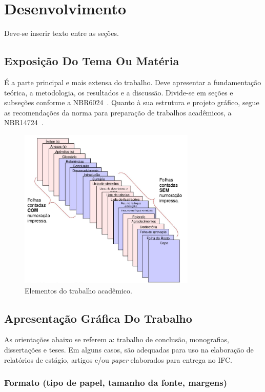 \chapter{Desenvolvimento}

Deve-se inserir texto entre as seções.

\section{Exposição Do Tema Ou Matéria}

É a parte principal e mais extensa do trabalho. Deve apresentar a fundamentação teórica, a metodologia, os resultados e a discussão. Divide-se em seções e subseções conforme a NBR6024~\cite{abnt6024}. 
Quanto à sua estrutura e projeto gráfico, segue as recomendações da norma para preparação de trabalhos acadêmicos, a NBR14724~\cite{abnt14724}.

\begin{figure}[!ht]
    \centering
    \caption{Elementos do trabalho acadêmico.}   \label{fig:fig1}
    \includegraphics[width = 0.75\textwidth]{images/___fig1.png}
\end{figure}

\section{Apresentação Gráfica Do Trabalho}
As orientações abaixo se referem a: trabalho de conclusão, monografias, dissertações e teses. Em alguns casos, são adequadas para uso na elaboração de relatórios de estágio, artigos e/ou \textit{paper} elaborados para entrega no IFC.


\subsection{Formato (tipo de papel, tamanho da fonte, margens)}


